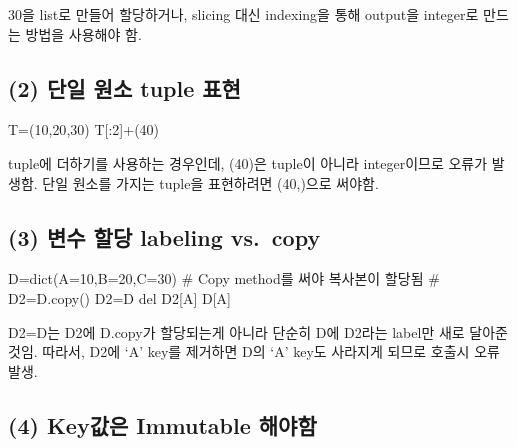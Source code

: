 \documentclass[
  letterpaper,
  DIV=11,
  numbers=noendperiod]{scrreprt}
\newenvironment{Shaded}{\begin{snugshade}}{\end{snugshade}}
\newcommand{\BuiltInTok}[1]{\textcolor[rgb]{0.00,0.23,0.31}{#1}}
\newcommand{\CommentTok}[1]{\textcolor[rgb]{0.37,0.37,0.37}{#1}}
\newcommand{\DecValTok}[1]{\textcolor[rgb]{0.68,0.00,0.00}{#1}}
\newcommand{\KeywordTok}[1]{\textcolor[rgb]{0.00,0.23,0.31}{#1}}
\newcommand{\NormalTok}[1]{\textcolor[rgb]{0.00,0.23,0.31}{#1}}
\newcommand{\OperatorTok}[1]{\textcolor[rgb]{0.37,0.37,0.37}{#1}}
\newcommand{\StringTok}[1]{\textcolor[rgb]{0.13,0.47,0.30}{#1}}
\begin{document}
30을 list로 만들어 할당하거나, slicing 대신 indexing을 통해 output을
integer로 만드는 방법을 사용해야 함.

\subsection*{(2) 단일 원소 tuple
표현}\label{uxb2e8uxc77c-uxc6d0uxc18c-tuple-uxd45cuxd604}

\begin{Shaded}
\begin{Highlighting}[]
\NormalTok{T}\OperatorTok{=}\NormalTok{(}\DecValTok{10}\NormalTok{,}\DecValTok{20}\NormalTok{,}\DecValTok{30}\NormalTok{)}
\NormalTok{T[:}\DecValTok{2}\NormalTok{]}\OperatorTok{+}\NormalTok{(}\DecValTok{40}\NormalTok{)}
\end{Highlighting}
\end{Shaded}

tuple에 더하기를 사용하는 경우인데, (40)은 tuple이 아니라 integer이므로
오류가 발생함. 단일 원소를 가지는 tuple을 표현하려면 (40,)으로 써야함.

\subsection*{(3) 변수 할당 labeling
vs.~copy}\label{uxbcc0uxc218-uxd560uxb2f9-labeling-vs.-copy}

\begin{Shaded}
\begin{Highlighting}[]
\NormalTok{D}\OperatorTok{=}\BuiltInTok{dict}\NormalTok{(A}\OperatorTok{=}\DecValTok{10}\NormalTok{,B}\OperatorTok{=}\DecValTok{20}\NormalTok{,C}\OperatorTok{=}\DecValTok{30}\NormalTok{)}
\CommentTok{\# Copy method를 써야 복사본이 할당됨}
\CommentTok{\# D2=D.copy()}
\NormalTok{D2}\OperatorTok{=}\NormalTok{D}
\KeywordTok{del}\NormalTok{ D2[}\StringTok{\textquotesingle{}A\textquotesingle{}}\NormalTok{]}
\NormalTok{D[}\StringTok{\textquotesingle{}A\textquotesingle{}}\NormalTok{]}
\end{Highlighting}
\end{Shaded}

D2=D는 D2에 D.copy가 할당되는게 아니라 단순히 D에 D2라는 label만 새로
달아준것임. 따라서, D2에 `A' key를 제거하면 D의 `A' key도 사라지게
되므로 호출시 오류 발생.

\subsection*{(4) Key값은 Immutable
해야함}\label{keyuxac12uxc740-immutable-uxd574uxc57cuxd568}
\end{document}
